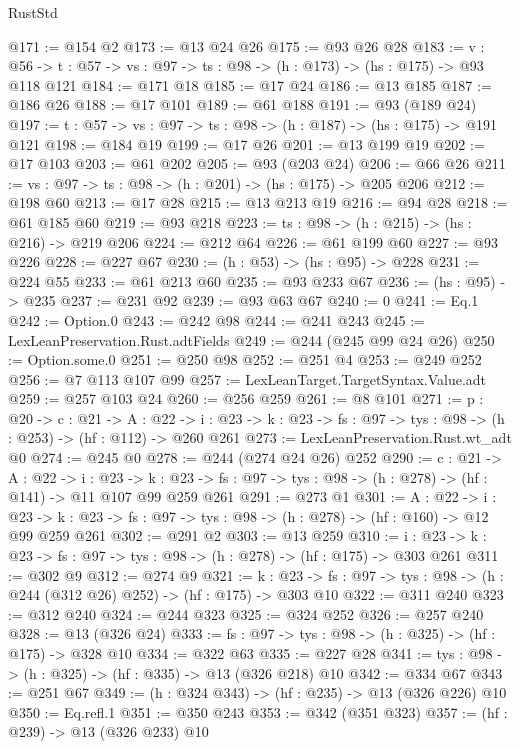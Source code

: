 \begin{lexlean}{RustStd}
\begin{coremodule}
@171 := @154 @2
@173 := @13 @24 @26
@175 := @93 @26 @28
@183 := {v : @56} ->
  {t : @57} -> {vs : @97} -> {ts : @98} -> (h : @173) -> (hs : @175) -> @93 @118 @121
@184 := @171 @18
@185 := @17 @24
@186 := @13 @185
@187 := @186 @26
@188 := @17 @101
@189 := @61 @188
@191 := @93 (@189 @24)
@197 := {t : @57} -> {vs : @97} -> {ts : @98} -> (h : @187) -> (hs : @175) -> @191 @121
@198 := @184 @19
@199 := @17 @26
@201 := @13 @199 @19
@202 := @17 @103
@203 := @61 @202
@205 := @93 (@203 @24)
@206 := @66 @26
@211 := {vs : @97} -> {ts : @98} -> (h : @201) -> (hs : @175) -> @205 @206
@212 := @198 @60
@213 := @17 @28
@215 := @13 @213 @19
@216 := @94 @28
@218 := @61 @185 @60
@219 := @93 @218
@223 := {ts : @98} -> (h : @215) -> (hs : @216) -> @219 @206
@224 := @212 @64
@226 := @61 @199 @60
@227 := @93 @226
@228 := @227 @67
@230 := (h : @53) -> (hs : @95) -> @228
@231 := @224 @55
@233 := @61 @213 @60
@235 := @93 @233 @67
@236 := (hs : @95) -> @235
@237 := @231 @92
@239 := @93 @63 @67
@240 := 0
@241 := Eq.{1}
@242 := Option.{0}
@243 := @242 @98
@244 := @241 @243
@245 := LexLeanPreservation.Rust.adtFields
@249 := @244 (@245 @99 @24 @26)
@250 := Option.some.{0}
@251 := @250 @98
@252 := @251 @4
@253 := @249 @252
@256 := @7 @113 @107 @99
@257 := LexLeanTarget.TargetSyntax.Value.adt
@259 := @257 @103 @24
@260 := @256 @259
@261 := @8 @101
@271 := {p : @20} ->
  {c : @21} ->
  {A : @22} ->
  {i : @23} -> {k : @23} -> {fs : @97} -> {tys : @98} -> (h : @253) -> (hf : @112) -> @260 @261
@273 := LexLeanPreservation.Rust.wt_adt @0
@274 := @245 @0
@278 := @244 (@274 @24 @26) @252
@290 := {c : @21} ->
  {A : @22} ->
  {i : @23} ->
  {k : @23} -> {fs : @97} -> {tys : @98} -> (h : @278) -> (hf : @141) -> @11 @107 @99 @259 @261
@291 := @273 @1
@301 := {A : @22} ->
  {i : @23} ->
  {k : @23} -> {fs : @97} -> {tys : @98} -> (h : @278) -> (hf : @160) -> @12 @99 @259 @261
@302 := @291 @2
@303 := @13 @259
@310 := {i : @23} ->
  {k : @23} -> {fs : @97} -> {tys : @98} -> (h : @278) -> (hf : @175) -> @303 @261
@311 := @302 @9
@312 := @274 @9
@321 := {k : @23} ->
  {fs : @97} -> {tys : @98} -> (h : @244 (@312 @26) @252) -> (hf : @175) -> @303 @10
@322 := @311 @240
@323 := @312 @240
@324 := @244 @323
@325 := @324 @252
@326 := @257 @240
@328 := @13 (@326 @24)
@333 := {fs : @97} -> {tys : @98} -> (h : @325) -> (hf : @175) -> @328 @10
@334 := @322 @63
@335 := @227 @28
@341 := {tys : @98} -> (h : @325) -> (hf : @335) -> @13 (@326 @218) @10
@342 := @334 @67
@343 := @251 @67
@349 := (h : @324 @343) -> (hf : @235) -> @13 (@326 @226) @10
@350 := Eq.refl.{1}
@351 := @350 @243
@353 := @342 (@351 @323)
@357 := (hf : @239) -> @13 (@326 @233) @10

\end{coremodule}
\end{lexlean}
